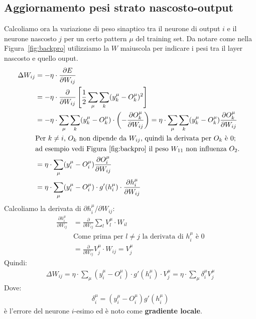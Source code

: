 	\newpage

	\subsection{Aggiornamento pesi strato nascosto-output} %
	\label{sub:aggiornamento_pesi_strato_nascosto_output}

	Calcoliamo ora la variazione di peso sinaptico tra il neurone di output $i$ e il neurone nascosto $j$ per un certo pattern $\mu$ del training set. Da notare come nella Figura~\ref{fig:backpro} utilizziamo la $W$ maiuscola per indicare i pesi tra il layer nascosto e quello ouput.
	\begin{align*}
		\Delta W_{ij} &= - \eta \cdot \frac{\partial E}{\partial W_{ij}} \\
		&= - \eta \cdot \frac{\partial}{\partial W_{ij}}\left[\frac{1}{2} \sum_\mu \sum_k (y_k^\mu - O_k^\mu)^2 \right]\\
		&= - \eta \cdot \sum_\mu \sum_k (y_k^\mu -O_k^\mu) \cdot \left( -  \frac{\partial O_k^\mu} {\partial W_{ij}} \right) = \eta \cdot \sum_\mu \sum_k (y_k^\mu -O_k^\mu) \frac{\partial O_k^\mu}{\partial W_{ij}} \\
		&\text{Per $k\neq i$, $O_k$ non dipende da $W_{ij}$, quindi la derivata per $O_k$ è 0;} \\
		&\text{ad esempio vedi Figura~\ref{fig:backpro} il peso $W_{11}$ non influenza $O_2$. } \\
		&= \eta \cdot \sum_\mu  (y_i^\mu - O_i^\mu) \frac{\partial O_i^\mu}{\partial W_{ij}} \\
		&= \eta \cdot \sum_\mu  (y_i^\mu - O_i^\mu) \cdot g'(h_i^\mu) \cdot \frac{\partial h_i^\mu}{\partial{W_{ij}}}
	\end{align*}
	Calcoliamo la derivata di $\partial h_i^\mu / \partial W_{ij}$:
	\begin{align*}
		\frac{\partial h_i^\mu}{\partial{W_{ij}}} &= \frac{\partial}{\partial{W_{ij}}} \sum_l V_l^\mu \cdot W_{il} \\
		& \text{Come prima per $l\neq j$ la derivata di $h^\mu_i$ è 0} \\
		&= \frac{\partial}{\partial{W_{ij}}} V_j^\mu \cdot W_{ij} = V_j^\mu
	\end{align*}
	Quindi:
	\begin{align*}
		\Delta W_{ij} = \eta \cdot \sum_\mu  (y_i^\mu - O_i^\mu) \cdot g'(h_i^\mu) \cdot V_j^\mu = \eta \cdot \sum_\mu \delta^\mu_i V^\mu_j
	\end{align*}
	Dove:
	\begin{align*}
		\delta^\mu_i = (y^\mu_i - O^\mu_i) g'(h^\mu_i)
	\end{align*}
	è l'errore del neurone $i$-esimo ed è noto come \textbf{gradiente locale}.
	\newpage

